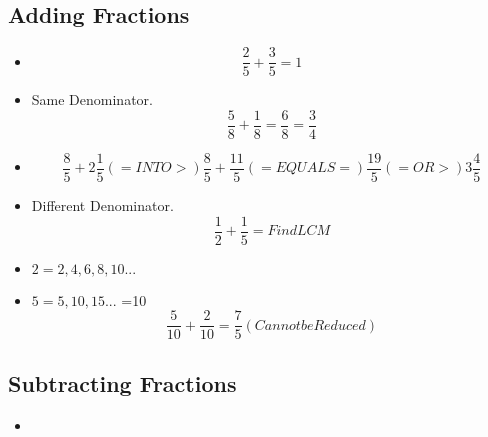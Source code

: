 \documentclass[]{article}
\begin{document}
\subsection{Adding Fractions}
\begin{itemize}
	\item \begin{equation}
	\frac {2}{5} + \frac{3}{5} = 1
	\end{equation}
	\item Same Denominator.
	\begin{equation}
		\frac{5}{8} + \frac{1}{8} = \frac{6}{8} = \frac{3}{4}
	\end{equation}
	\item 
	\begin{itemize}
		\begin{equation}
			\frac{8}{5} + 2 \frac{1}{5} (=INTO>)
			\frac{8}{5} + \frac{11}{5} (=EQUALS=) 
			\frac{19}{5}  (=OR>)  3 \frac{4}{5}
	\end{equation}
\end{itemize}
	\item Different Denominator.
	\begin{equation}
		\frac{1}{2} + \frac{1}{5} = Find LCM 
	\end{equation}
	\item $2 = 2,4,6,8,10... $
	\item $5 = 5,10,15... $
			=10
	\begin{equation}
		\frac{5}{10} + \frac{2}{10} = \frac{7}{5} (Cannot be Reduced)
	\end{equation}
	

	
\end{itemize}

\subsection{Subtracting Fractions}
\begin{itemize}
	\item 
\end{itemize}
\end{document}

